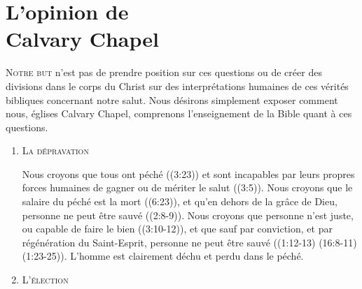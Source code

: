 \chapter[L'opinion de Calvary Chapel]{L'opinion de\\ Calvary Chapel}

\begin{specialpar}{}
\lettrine{N}{otre but} n'est pas de prendre position sur ces questions
  ou de créer des \pocketlinebreak
 divisions dans le corps du Christ
 sur des interprétations humaines de ces vérités bibliques
 concernant notre salut.
 Nous désirons simplement exposer comment nous,
 églises Calvary Chapel, comprenons l'en\-sei\-gnement de la Bible
 quant à ces questions.
\end{specialpar}
 
\begin{enumerate}

  \item  \textsc{La dépravation}

\nobreak
\begin{specialpar}{}
Nous croyons que tous ont péché
 ((3:23)) et
 sont incapables par leurs propres forces humaines de gagner ou
 de mériter le salut ((3:5)).
 Nous croyons que le \pocketlinebreak
 salaire du péché est la mort ((6:23)),
 et qu'en dehors de la grâce de Dieu, personne ne peut être sauvé
 ((2:8-9)).
 Nous cro\-yons que personne n'est juste, ou \pocketlinebreak 
 capable de faire le bien
 (\BRallowhypbch{}(3:10-12)\BRforbidhypbch), et que sauf par conviction,
 et par régénération du Saint-Esprit, personne ne peut être sauvé
 (\BRallowhypbch{}(1:12-13)\BRchsep
 (16:8-11)\BRchsep
 (1:23-25)\BRforbidhypbch).\pocketlinebreak
 L'homme est clairement déchu et perdu dans le péché.
\end{specialpar}


  \item  \textsc{L'élection}


\end{enumerate}
